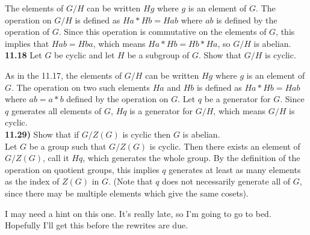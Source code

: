 \documentclass{scrartcl}
\begin{document}
The elements of $G/H$ can be written $Hg$ where $g$ is an element of $G$. The operation on $G/H$ is defined as $Ha*Hb=Hab$ where $ab$ is defined by the operation of $G$. Since this operation is commutative on the elements of $G$, this implies that $Hab=Hba$, which means $Ha*Hb=Hb*Ha$, so $G/H$ is abelian.\\

\textbf{11.18} Let $G$ be cyclic and let $H$ be a subgroup of $G$. Show that $G/H$ is cyclic.

As in the 11.17, the elements of $G/H$ can be written $Hg$ where $g$ is an element of $G$. The operation on two such elements $Ha$ and $Hb$ is defined as $Ha*Hb=Hab$ where $ab=a*b$ defined by the operation on $G$. Let $q$ be a generator for $G$. Since $q$ generates all elements of $G$, $Hq$ is a generator for $G/H$, which means $G/H$ is cyclic.\\

\textbf{11.29)} Show that if $G/Z(G)$ is cyclic then $G$ is abelian.\\

Let $G$ be a group such that $G/Z(G)$ is cyclic. Then there exists an element of $G/Z(G)$, call it $Hq$, which generates the whole group. By the definition of the operation on quotient groups, this implies $q$ generates at least as many elements as the index of $Z(G)$ in $G$. (Note that $q$ does not necessarily generate all of $G$, since there may be multiple elements which give the same cosets).

I may need a hint on this one. It's really late, so I'm going to go to bed. Hopefully I'll get this before the rewrites are due.
\end{document}
